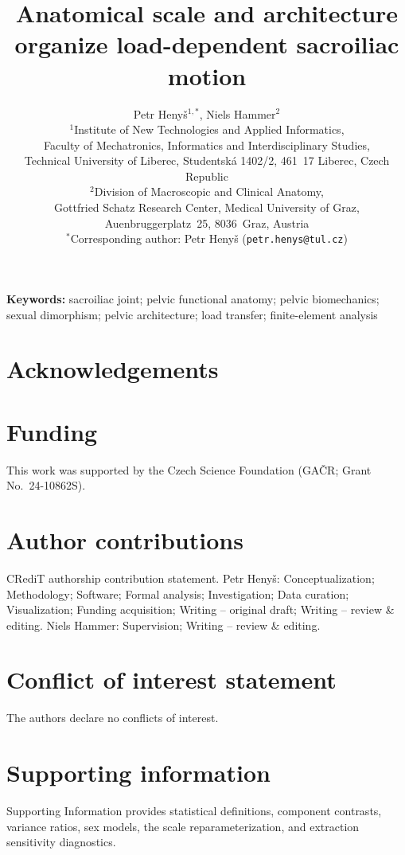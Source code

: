 \documentclass[11pt,a4paper]{article}
\title{Anatomical scale and architecture organize load-dependent sacroiliac motion}
\author{%
Petr Heny\v{s}$^{1,*}$, Niels Hammer$^{2}$\\
\small $^{1}$Institute of New Technologies and Applied Informatics,\\
\small Faculty of Mechatronics, Informatics and Interdisciplinary Studies,\\
\small Technical University of Liberec, Studentsk\'a 1402/2, 461~17 Liberec, Czech Republic\\
\small $^{2}$Division of Macroscopic and Clinical Anatomy,\\
\small Gottfried Schatz Research Center, Medical University of Graz,\\
\small Auenbruggerplatz~25, 8036~Graz, Austria\\
\small $^{*}$Corresponding author: Petr Heny\v{s} (\texttt{petr.henys@tul.cz})%
}
\date{}
\begin{document}
\doublespacing
\begingroup
\singlespacing
\maketitle
\endgroup
\linenumbers

\begin{abstract}

\end{abstract}

\noindent\textbf{Keywords:} sacroiliac joint; pelvic functional anatomy; pelvic biomechanics; sexual dimorphism; pelvic architecture; load transfer; finite-element analysis



\FloatBarrier

\FloatBarrier





\section*{Acknowledgements}

\section*{Funding}
This work was supported by the Czech Science Foundation (GA\v{C}R; Grant No.\ 24-10862S).

\section*{Author contributions}
CRediT authorship contribution statement. Petr Heny\v{s}: Conceptualization; Methodology; Software; Formal analysis; Investigation; Data curation; Visualization; Funding acquisition; Writing -- original draft; Writing -- review \& editing. Niels Hammer: Supervision; Writing -- review \& editing.

\section*{Conflict of interest statement}
The authors declare no conflicts of interest.

\section*{Supporting information}
Supporting Information provides statistical definitions, component contrasts, variance ratios, sex models, the scale reparameterization, and extraction sensitivity diagnostics.
\end{document}
